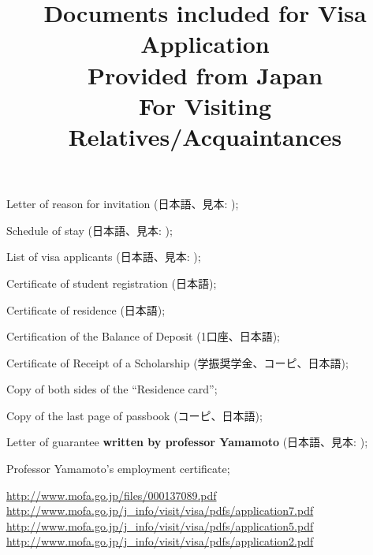 \documentclass[12pt]{article} %
\title{Documents included for Visa Application\\Provided from Japan\\For Visiting Relatives/Acquaintances}
\newcommand{\cmark}{\ding{51}}%
\newcommand{\done}{\rlap{$\square$}{\raisebox{2pt}{\large\hspace{1pt}\cmark}}%
\hspace{-2.5pt}}
\begin{document}
\maketitle
\begin{todolist}
	\item Letter of reason for invitation (日本語、見本: \cite{reasonletter});
	\item Schedule of stay (日本語、見本: \cite{schedule});
	\item List of visa applicants (日本語、見本: \cite{applicantlist});
	\item[\done] Certificate of student registration (日本語);
	\item[\done] Certificate of residence (日本語);
	\item[\done] Certification of the Balance of Deposit (1口座、日本語);
	\item[\done] Certificate of Receipt of a Scholarship (学振奨学金、コーピ、日本語);
	\item[\done] Copy of both sides of the ``Residence card'';
	\item[\done] Copy of the last page of passbook (コーピ、日本語);
	\item[\done] Letter of guarantee \textbf{written by professor Yamamoto} (日本語、見本: \cite{guarantee});
	\item[\done] Professor Yamamoto's employment certificate;
\end{todolist}

\begin{thebibliography}{9}
	\url{http://www.mofa.go.jp/files/000137089.pdf}
	\url{http://www.mofa.go.jp/j_info/visit/visa/pdfs/application7.pdf}
	\url{http://www.mofa.go.jp/j_info/visit/visa/pdfs/application5.pdf}
	\url{http://www.mofa.go.jp/j_info/visit/visa/pdfs/application2.pdf}
\end{thebibliography}
\end{document}
